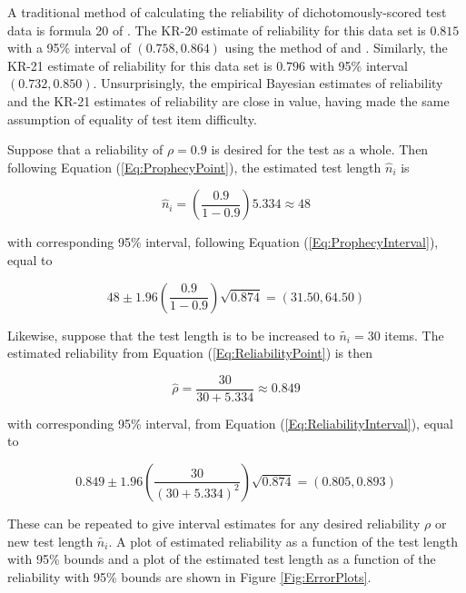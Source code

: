 \documentclass[12pt,epsfig]{article}
\begin{document}
A traditional method of calculating the reliability of dichotomously-scored test data  is formula 20 of \cite{Kuder1937}. The KR-20 estimate of reliability for this data set is $0.815$ with a 95\% interval of $(0.758, 0.864)$ using the method of \cite{Feldt1965} and \cite{Feldt1987}. Similarly, the KR-21 estimate of reliability for this data set is $0.796$ with 95\% interval $(0.732,0.850)$. Unsurprisingly, the empirical Bayesian estimates of reliability and the KR-21 estimates of reliability are close in value, having made the same assumption of equality of test item difficulty. 

Suppose that a reliability of $\rho = 0.9$ is desired for the test as a whole. Then following Equation (\ref{Eq:ProphecyPoint}), the estimated test length $\hat{n}_i$ is 

\begin{equation*}
    \hat{n}_i = \left(\dfrac{0.9}{1-0.9}\right) 5.334 \approx 48
\end{equation*}

\noindent with corresponding 95\% interval, following Equation (\ref{Eq:ProphecyInterval}), equal to

\begin{equation*}
    48 \pm 1.96 \left(\dfrac{0.9}{1-0.9}\right) \sqrt{0.874} = (31.50, 64.50)
\end{equation*}

Likewise, suppose that the test length is to be increased to $\tilde{n_i} = 30$ items. The estimated reliability from Equation (\ref{Eq:ReliabilityPoint}) is then

\begin{equation*}
    \hat{\rho} = \dfrac{30}{30 + 5.334} \approx 0.849
\end{equation*}

\noindent with corresponding 95\% interval, from Equation (\ref{Eq:ReliabilityInterval}), equal to

\begin{equation*}
    0.849 \pm 1.96 \left(\dfrac{30}{(30+5.334)^2}\right) \sqrt{0.874} = (0.805, 0.893)
\end{equation*}

These can be repeated to give interval estimates for any desired reliability $\rho$ or new test length $\tilde{n_i}$. A plot of estimated reliability as a function of the test length with 95\% bounds and a plot of the estimated test length as a function of the reliability with 95\% bounds are shown in Figure \ref{Fig:ErrorPlots}.
\end{document}
